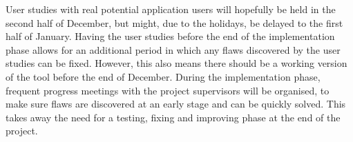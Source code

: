 User studies with real potential application users will hopefully be held in the second half of December, but might, due to the holidays, be delayed to the first half of January. Having the user studies before the end of the implementation phase allows for an additional period in which any flaws discovered by the user studies can be fixed. However, this also means there should be a working version of the tool before the end of December. During the implementation phase, frequent progress meetings with the project supervisors will be organised, to make sure flaws are discovered at an early stage and can be quickly solved. This takes away the need for a testing, fixing and improving phase at the end of the project.
